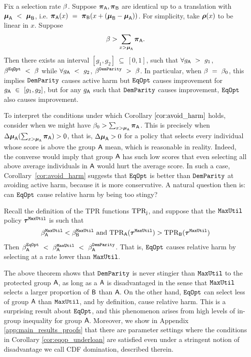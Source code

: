 \begin{cor}\label{cor:avoid_harm} Fix a selection rate $\beta$. Suppose $\boldsymbol{\pi}_{\mathsf{A}}, \boldsymbol{\pi}_{\mathsf{B}}$ are identical up to a translation with $\boldsymbol{\mu}_{\mathsf{A}}~<~\boldsymbol{\mu}_{\mathsf{B}}$, i.e. $\boldsymbol{\pi}_{\mathsf{A}}(x)~=~\boldsymbol{\pi}_{\mathsf{B}}(x+(\boldsymbol{\mu}_{\mathsf{B}}-\boldsymbol{\mu}_{\mathsf{A}}))$. For simplicity, take $\boldsymbol{\rho}(x)$ to be linear in $x$. Suppose \[ \beta > \sum_{x > \boldsymbol{\mu} _{\mathsf{A}} } \boldsymbol{\pi}_{\mathsf{A}}. \] 
Then there exists an interval $[g_1, g_2]~\subseteq~[0,1]$, such that $\forall g_{\mathsf{A}}~>~g_1$, $\beta^{\mathtt{EqOpt}}~<~\beta$ while $\forall g_{\mathsf{A}}~<~g_2$, $\beta^{\mathtt{DemParity}}~>~\beta$. In particular, when $\beta~=~\beta_0$, this implies $\mathtt{DemParity}$ causes active harm but $\mathtt{EqOpt}$ causes improvement for $g_{\mathsf{A}} ~\in~[g_1, g_2]$, but for any $g_{\mathsf{A}} $ such that $\mathtt{DemParity}$ causes improvement, $\mathtt{EqOpt}$ also causes improvement.
\end{cor} 

To interpret the conditions under which Corollary $\ref{cor:avoid_harm}$ holds, consider when we might have $\beta_0 > \sum_{x > \boldsymbol{\mu} _{\mathsf{A}} } \boldsymbol{\pi}_{\mathsf{A}}$. This is precisely when $\Delta\boldsymbol{\mu}_{\mathsf{A}}( \sum_{x > \boldsymbol{\mu} _{\mathsf{A}} } \boldsymbol{\pi}_{\mathsf{A}}) > 0$, that is, $\Delta\boldsymbol{\mu}_{\mathsf{A}} > 0$ for a policy that selects every individual whose score is above the group $\mathsf{A}$ mean, which is reasonable in reality. Indeed, the converse would imply that group $\mathsf{A}$ has such low scores that even selecting all above average individuals in $\mathsf{A}$ would hurt the average score. In such a case, Corollary~\ref{cor:avoid_harm} suggests that $\mathtt{EqOpt}$ is better than $\mathtt{DemParity}$ at avoiding active harm, because it is more conservative. A natural question then is: can $\mathtt{EqOpt}$ cause relative harm by being too stingy? 

\begin{cor} \label{cor:eqop_underloan} Recall the definition of the TPR functions $\mathrm{TPR}_{\mathsf{j}}$, and suppose that the $\mathtt{MaxUtil}$ policy $\boldsymbol{\tau}^{\mathtt{MaxUtil}}$ is such that
\begin{eqnarray}
\beta^{\mathtt{MaxUtil}}_{\mathsf{A}} < \beta^{\mathtt{MaxUtil}}_{\mathsf{B}}\text{ and }
\mathrm{TPR}_{\mathsf{A}}(\boldsymbol{\tau}^{\mathtt{MaxUtil}}) > \mathrm{TPR}_{\mathsf{B}}(\boldsymbol{\tau}^{\mathtt{MaxUtil}})
\end{eqnarray}
Then $\beta_{\mathsf{A}}^{\mathtt{EqOpt}}~<~\beta_{\mathsf{A}}^{\mathtt{MaxUtil}}~<~\beta_{\mathsf{A}}^{\mathtt{DemParity}}$. That is, $\mathtt{EqOpt}$ causes relative harm by selecting at a rate lower than $\mathtt{MaxUtil}$.
\end{cor}

The above theorem shows that $\mathtt{DemParity}$ is never stingier than $\mathtt{MaxUtil}$ to the protected group $\mathsf{A}$, as long as a $\mathsf{A}$ is disadvantaged in the sense that $\mathtt{MaxUtil}$ selects a larger proportion of $\mathsf{B}$ than $\mathsf{A}$. On the other hand, $\mathtt{EqOpt}$ can select less of group $\mathsf{A}$ than $\mathtt{MaxUtil}$, and by definition, cause relative harm. This is a surprising result about $\mathtt{EqOpt}$, and this phenomenon arises from high levels of in-group inequality for group $\mathsf{A}$. Moreover, we show in Appendix \ref{app:main_results_proofs} that there are parameter settings where the conditions in Corollary \ref{cor:eqop_underloan} are satisfied even under a stringent notion of disadvantage we call CDF domination, described therein.



